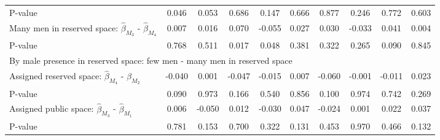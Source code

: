 \begin{tabular}{l*{9}{c}}
\quad P-value       &       0.046         &       0.053         &       0.686         &       0.147         &       0.666         &       0.877         &       0.246         &       0.772         &       0.603         \\
\quad Many men in reserved space: $\hat\beta_{M_3}$ - $\hat\beta_{M_4}$&       0.007         &       0.016         &       0.070         &      -0.055         &       0.027         &       0.030         &      -0.033         &       0.041         &       0.004         \\
\quad P-value       &       0.768         &       0.511         &       0.017         &       0.048         &       0.381         &       0.322         &       0.265         &       0.090         &       0.845         \\
\multicolumn{10}{l}{By male presence in reserved space: few men - many men in reserved space} \\ \quad Assigned reserved space: $\hat\beta_{M_4}$ - $\hat\beta_{M_2}$&      -0.040         &       0.001         &      -0.047         &      -0.015         &       0.007         &      -0.060         &      -0.001         &      -0.011         &       0.023         \\
\quad P-value       &       0.090         &       0.973         &       0.166         &       0.540         &       0.856         &       0.100         &       0.974         &       0.742         &       0.269         \\
\quad Assigned public space: $\hat\beta_{M_3}$ - $\hat\beta_{M_1}$&       0.006         &      -0.050         &       0.012         &      -0.030         &       0.047         &      -0.024         &       0.001         &       0.022         &       0.037         \\
\quad P-value       &       0.781         &       0.153         &       0.700         &       0.322         &       0.131         &       0.453         &       0.970         &       0.466         &       0.132         \\
\hline\hline \end{tabular}
